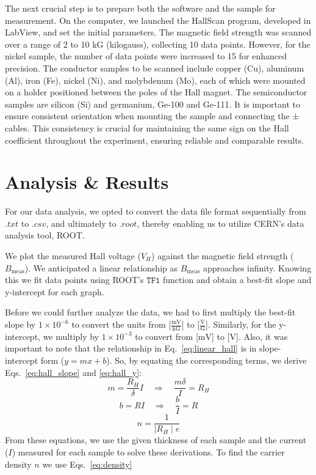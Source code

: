 \documentclass[a4paper,12pt,english]{all-in-one} %
\begin{document}
\begin{multicols}{2}
{The next crucial step is to prepare both the software and the sample for measurement. On the computer, we launched the HallScan program, developed in LabView, and set the initial parameters. The magnetic field strength was scanned over a range of 2 to 10 kG (kilogauss), collecting 10 data points. However, for the nickel sample, the number of data points were increased to 15 for enhanced precision. The conductor samples to be scanned include copper (Cu), aluminum (Al), iron (Fe), nickel (Ni), and molybdenum (Mo), each of which were mounted on a holder positioned between the poles of the Hall magnet. The semiconductor samples are silicon (Si) and germanium, Ge-100 and Ge-111. It is important to ensure consistent orientation when mounting the sample and connecting the ± cables. This consistency is crucial for maintaining the same sign on the Hall coefficient throughout the experiment, ensuring reliable and comparable results.
}

\section*{Analysis \& Results}
{
For our data analysis, we opted to convert the data file format sequentially from $.txt$ to $.csv$, and ultimately to $.root$, thereby enabling us to utilize CERN's data analysis tool, ROOT.

We plot the measured Hall voltage ($V_{H}$) against the magnetic field strength ($B_{\text{meas}}$). We anticipated a linear relationship as $B_{\text{meas}}$ approaches infinity. Knowing this we fit data points using ROOT's $\texttt{TF1}$ function and obtain a best-fit slope and y-intercept for each graph.

Before we could further analyze the data, we had to first multiply the best-fit slope by $1 \times 10^{-6}$ to convert the units from [$\frac{\text{mV}}{\text{kG}}$] to [$\frac{\text{V}}{\text{G}}$]. Similarly, for the y-intercept, we multiply by $1 \times 10^{-3}$ to convert from [$\text{mV}$] to [$\text{V}$]. Also, it was important to note that the relationship in Eq.~\eqref{eq:linear_hall} is in slope-intercept form ($y = mx + b$). So, by equating the corresponding terms, we derive Eqs.~\eqref{eq:hall_slope} and \eqref{eq:hall_y}:
\begin{equation}\label{eq:hall_slope}
m = \frac{R_H}{\delta}I \quad \Rightarrow \quad \frac{m\delta}{I}  = R_H
\end{equation}
\begin{equation}\label{eq:hall_y}
b = RI \quad \Rightarrow \quad \frac{b}{I} = R
\end{equation}
\begin{equation}\label{eq:density}
n = \frac{1}{\mid R_H \mid e}
\end{equation}
From these equations, we use the given thickness of each sample and the current ($I$) measured for each sample to solve these derivations. To find the carrier density $n$ we use Eqs.~\eqref{eq:density}

}
\end{multicols}
\end{document}
